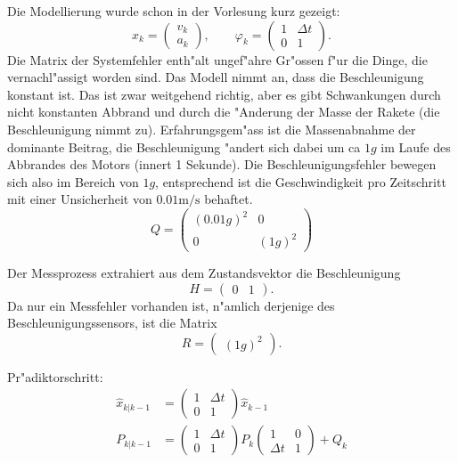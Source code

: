 \begin{loesung}
\begin{teilaufgaben}
\item Die Modellierung wurde schon in der Vorlesung kurz gezeigt:
\[
x_k=\begin{pmatrix}v_k\\a_k\end{pmatrix},\qquad
\varphi_k=\begin{pmatrix}1&\Delta t\\0&1\end{pmatrix}.
\]
Die Matrix der Systemfehler enth"alt ungef"ahre Gr"ossen f"ur die Dinge,
die vernachl"assigt worden sind. Das Modell nimmt an, dass die
Beschleunigung konstant ist.
Das ist zwar weitgehend richtig, aber es gibt Schwankungen durch
nicht konstanten Abbrand und durch die "Anderung der Masse der
Rakete (die Beschleunigung nimmt zu). Erfahrungsgem"ass ist die
Massenabnahme der dominante Beitrag, die Beschleunigung "andert sich
dabei um ca $1g$ im Laufe des Abbrandes des Motors (innert 1 Sekunde).
Die Beschleunigungsfehler bewegen sich also im Bereich von $1g$, entsprechend
ist die Geschwindigkeit pro Zeitschritt mit einer Unsicherheit von
$0.01\text{m/s}$ behaftet.
\[
Q=\begin{pmatrix}
(0.01g)^2&0\\
0&(1g)^2
\end{pmatrix}
\]
\item
Der Messprozess extrahiert aus dem Zustandsvektor die Beschleunigung
\[
H=\begin{pmatrix}0&1\end{pmatrix}.
\]
Da nur ein Messfehler vorhanden ist, n"amlich derjenige des
Beschleunigungssensors, ist die Matrix
\[
R=\begin{pmatrix}
(1g)^2
\end{pmatrix}.
\]
\item Pr"adiktorschritt:
\begin{align*}
\hat x_{k|k-1}&=
\begin{pmatrix}1&\Delta t\\0&1\end{pmatrix}
\hat x_{k-1}
\\
P_{k|k-1}&=
\begin{pmatrix}1&\Delta t\\0&1\end{pmatrix}P_k
\begin{pmatrix}1&0\\\Delta t&1\end{pmatrix}
+
Q_k
\end{align*}

\end{teilaufgaben}
\end{loesung}
